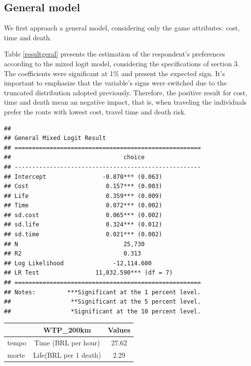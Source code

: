 \documentclass[]{elsarticle} %
\begin{document}
\hypertarget{general-model}{%
\subsection{General model}\label{general-model}}

We first approach a general model, considering only the game attributes:
cost, time and death.

Table \ref{resultgeral} presents the estimation of the respondent's
preferences according to the mixed logit model, considering the
specifications of section 3. The coefficients were significant at 1\%
and present the expected sign. It's important to emphasize that the
variable's signs were switched due to the truncated distribution adopted
previously. Therefore, the positive result for cost, time and death mean
an negative impact, that is, when traveling the individuals prefer the
route with lowest cost, travel time and death risk.

\begin{verbatim}
## 
## General Mixed Logit Result
## =====================================================
##                                choice                
## -----------------------------------------------------
## Intercept                -0.870*** (0.063)           
## Cost                      0.157*** (0.003)           
## Life                      0.359*** (0.009)           
## Time                      0.072*** (0.002)           
## sd.cost                   0.065*** (0.002)           
## sd.life                   0.324*** (0.012)           
## sd.time                   0.021*** (0.002)           
## N                              25,730                
## R2                             0.313                 
## Log Likelihood              -12,114.600              
## LR Test                11,032.590*** (df = 7)        
## =====================================================
## Notes:         ***Significant at the 1 percent level.
##                 **Significant at the 5 percent level.
##                 *Significant at the 10 percent level.
\end{verbatim}

\begin{table}[H]
\centering
\begin{tabular}{l|c|c}
\hline
  & WTP\_200km & Values\\
\hline
tempo & Time (BRL per hour) & 27.62\\
\hline
morte & Life(BRL per 1 death) & 2.29\\
\hline
\end{tabular}
\end{table}
\end{document}
